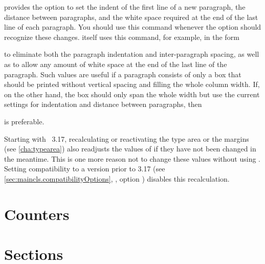 \begin{Declaration}
\end{Declaration}
\KOMAScript{} provides the option to set the indent of the first line of a new
paragraph, the distance between paragraphs, and the white space required at the
end of the last line of each paragraph. You should use this command whenever
the  option should recognize these
changes. \KOMAScript{} itself uses this command, for
example, in the form
\begin{lstcode}
\end{lstcode}
to eliminate both the paragraph indentation and inter-paragraph spacing, as
well as to allow any amount of white space at the end of the last line of the
paragraph.  Such values are useful if a paragraph consists of only a box that
should be printed without vertical spacing and filling the whole column
width. If, on the other hand, the box should only span the whole width but use
the current settings for indentation and distance between paragraphs, then
\begin{lstcode}
  \setlength{\parfillskip}{0pt plus 1fil}
\end{lstcode}
is preferable.

Starting with \KOMAScript~3.17, recalculating or
reactivating the type area or the margins (see
\autoref{cha:typearea}) also readjusts the values of  if
they have not been changed in the meantime. This is one more reason not to
change these values without using \KOMAScript. Setting compatibility to a
\KOMAScript{} version prior to 3.17 (see
\autoref{sec:maincls.compatibilityOptions},
, option %
)
disables this recalculation.%
%
\EndIndexGroup

\section{Counters}


\section{Sections}

